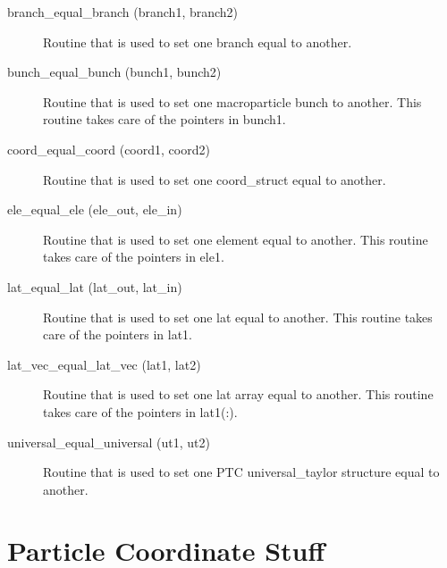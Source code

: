 \begin{description}

\label{r:branch.equal.branch}
\item[branch_equal_branch (branch1, branch2)] \Newline 
Routine that is used to set one branch equal to another. 

\label{r:bunch.equal.bunch}
\item[bunch_equal_bunch (bunch1, bunch2)] \Newline
Routine that is used to set one macroparticle bunch to another. This routine
takes care of the pointers in bunch1.

\label{r:coord.equal.coord}
\item[coord_equal_coord (coord1, coord2)] \Newline
Routine that is used to set one coord_struct equal to another. 

\label{r:ele.equal.ele}
\item[ele_equal_ele (ele_out, ele_in)] \Newline
Routine that is used to set one element equal to another. 
This routine takes care of the pointers in ele1. 

\label{r:lat.equal.lat}
\item[lat_equal_lat (lat_out, lat_in)] \Newline
Routine that is used to set one lat equal to another. 
This routine takes care of the pointers in lat1. 

\label{r:lat.vec.equal.lat.vec}
\item[lat_vec_equal_lat_vec (lat1, lat2)] \Newline
Routine that is used to set one lat array equal to another. 
This routine takes care of the pointers in lat1(:). 

\label{r:universal.equal.universal}
\item[universal_equal_universal (ut1, ut2)] \Newline
Routine that is used to set one PTC universal_taylor 
structure equal to another. 

\end{description}

\section{Particle Coordinate Stuff}
\label{r:coord.stuff}    

